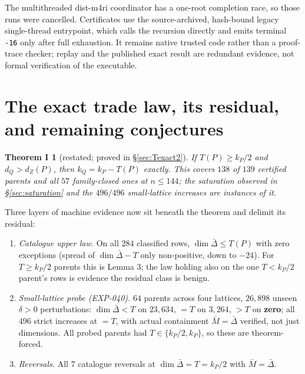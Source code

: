\documentclass[11pt]{article}
\theoremstyle{plain}
\newtheorem*{theoremI}{Theorem I}
\theoremstyle{remark}
\begin{document}
The multithreaded dist-m4ri coordinator has a one-root completion race, so
those runs were cancelled. Certificates use the source-archived, hash-bound
legacy single-thread entrypoint, which calls the recursion directly and emits
terminal \texttt{-16} only after full exhaustion. It remains native trusted
code rather than a proof-trace checker; replay and the published exact result
are redundant evidence, not formal verification of the executable.

\section{The exact trade law, its residual, and remaining conjectures}\label{sec:conjectures}

\begin{theoremI}[restated; proved in \S\ref{sec:Texact2}]
If $T(P)\ge k_P/2$ and $d_Q>d_Z(P)$,
then $k_Q=k_P-T(P)$ exactly. This covers $138$ of $139$ certified parents and
all $57$ family-closed ones at $n\le 144$; the saturation observed in \S\ref{sec:saturation} and
the $496/496$ small-lattice increases are instances of it.
\end{theoremI}

Three layers of machine evidence now sit beneath the theorem and delimit its
residual:
\begin{enumerate}
\item \emph{Catalogue upper law.} On all $284$ classified rows,
   $\dim\bar\Delta\le T(P)$ with zero exceptions (spread of
   $\dim\bar\Delta-T$ only non-positive, down to $-24$). For $T\ge k_P/2$
   parents this is Lemma 3; the law holding also on the one $T<k_P/2$ parent's
   rows is evidence the residual class is benign.
\item \emph{Small-lattice probe (EXP-040).} $64$ parents across four lattices,
   $26{,}898$ unseen $\delta>0$ perturbations: $\dim\bar\Delta<T$ on $23{,}634$,
   $=T$ on $3{,}264$, $>T$ on \textbf{zero}; all $496$ strict increases at $=T$, with
   actual containment $\bar M=\bar\Delta$ verified, not just dimensions. All
   probed parents had $T\in\{k_P/2,k_P\}$, so these are theorem-forced.
\item \emph{Reversals.} All $7$ catalogue reversals at $\dim\bar\Delta=T=k_P/2$ with
   $\bar M=\bar\Delta$.
\end{enumerate}
\end{document}
